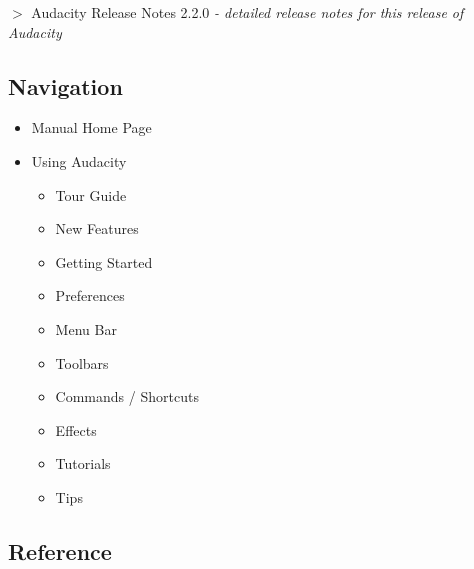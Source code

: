 \textbf{\mbox{$>$}} Audacity Release Notes 2.2.0 \textit{- detailed release notes for this release of Audacity}%
% 
%  
% 
%  

																																																				
\subsection{Navigation}

					\begin{itemize}\item  Manual Home Page
\item  Using Audacity
\begin{itemize}
\item  Tour Guide
\item  New Features
\item  Getting Started
\item  Preferences
\item  Menu Bar
\item  Toolbars
\item  Commands / Shortcuts
\item  Effects
\item  Tutorials
\item  Tips
\end{itemize}
\end{itemize}
								
\subsection{Reference}

